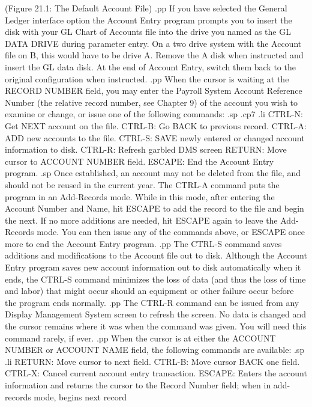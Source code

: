 	    (Figure 21.1: The Default Account File)
.pp
If you have selected the General Ledger interface option the Account
Entry program prompts you to insert the disk with your GL Chart of
Accounts file into the drive you named as the GL DATA DRIVE during
parameter entry.  On a two drive system with the Account file on B,
this would have to be drive A.	Remove the A disk when instructed and
insert the GL data disk.  At the end of Account Entry, switch them
back to the original configuration when instructed.
.pp
When the cursor is waiting at the RECORD NUMBER field, you may enter
the Payroll System Account Reference Number (the relative record number,
see Chapter 9)
of the account you wish to examine or change, or issue one of the
following commands:
.sp
.cp7
.li
	    CTRL-N: Get NEXT account on the file.
	    CTRL-B: Go BACK to previous record.
	    CTRL-A: ADD new accounts to the file.
	    CTRL-S: SAVE newly entered or changed account
		    information to disk.
	    CTRL-R: Refresh garbled DMS screen
	    RETURN: Move cursor to ACCOUNT NUMBER field.
	    ESCAPE: End the Account Entry program.
.sp
Once established, an account may not be deleted from the file, and
should not be reused in the current year.  The CTRL-A command puts
the program in an Add-Records mode.  While in this mode,
after entering the Account Number and Name, hit ESCAPE to add the record
to the file and begin the next.  If no more additions are needed, hit
ESCAPE again to leave the Add-Records mode.  You can then issue any of the
commands above, or ESCAPE once more to end the Account Entry program.
.pp
The CTRL-S command saves additions and modifications to the Account file
out to disk.  Although the Account Entry program saves new account information
out to disk automatically when it ends, the CTRL-S command minimizes the
loss of data (and thus the loss of time and labor) that might occur should
an equipment or other failure occur before the program ends normally.
.pp
The CTRL-R command can be issued from any Display Management System
screen to refresh the screen.  No data is changed and the cursor remains
where it was when the command was given.  You will need this command
rarely, if ever.
.pp
When the cursor is at either the ACCOUNT NUMBER or ACCOUNT NAME field,
the following commands are available:
.sp
.li
	    RETURN: Move cursor to next field.
	    CTRL-B: Move cursor BACK one field.
	    CTRL-X: Cancel current account entry transaction.
	    ESCAPE: Enters the account information and returns
		    the cursor to the Record Number field;
		    when in add-records mode, begins next record
